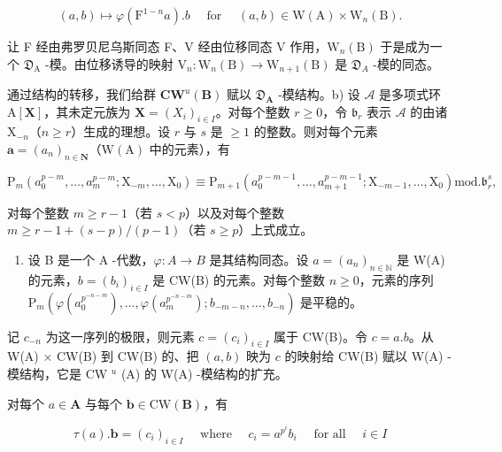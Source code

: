 \[
(a, b) \mapsto \varphi (\mathrm{F} ^ {1 - n} a). b \quad \text { for } \quad (a, b) \in \mathrm{W} (\mathrm{A}) \times \mathrm{W} _ {n} (\mathrm{B}).
\]

让 F 经由弗罗贝尼乌斯同态 F、V 经由位移同态 V 作用，\(\mathrm{W}_{n}(\mathrm{B})\) 于是成为一个 \(\mathfrak{D}_{\mathrm{A}}\) -模。由位移诱导的映射 \(\mathrm{V}_{n}:\mathrm{W}_{n}(\mathrm{B})\to\mathrm{W}_{n+1}(\mathrm{B})\) 是 \(\mathfrak{D}_{A}\) -模的同态。

通过结构的转移，我们给群 \(\mathbf{CW}^u (\mathbf{B})\) 赋以 \(\mathfrak{D}_{\mathbf{A}}\) -模结构。b) 设 \(\mathcal{A}\) 是多项式环 \(\mathrm{A}[\mathbf{X}]\)，其未定元族为 \(\mathbf{X} = (X_i)_{i\in I}\)。对每个整数 \(r\geqslant 0\)，令 \(\mathfrak{b}_r\) 表示 \(\mathcal{A}\) 的由诸 \(\mathrm{X}_{-n}\)（\(n\geqslant r\)）生成的理想。设 \(r\) 与 \(s\) 是 \(\geqslant 1\) 的整数。则对每个元素 \(\boldsymbol {a} = (a_n)_{n\in \mathbf{N}}\)（\(\mathrm{W(A)}\) 中的元素），有

\[
\mathrm{P} _ {m} \left(a _ {0} ^ {p - m}, \dots , a _ {m} ^ {p - m}; \mathrm{X} _ {- m}, \dots , \mathrm{X} _ {0}\right) \equiv \mathrm{P} _ {m + 1} \left(a _ {0} ^ {p - m - 1}, \dots , a _ {m + 1} ^ {p - m - 1}; \mathrm{X} _ {- m - 1}, \dots , \mathrm{X} _ {0}\right) \text {mod.} \mathfrak {b} _ {r} ^ {s},
\]

对每个整数 \(m \geqslant r - 1\)（若 \(s < p\)）以及对每个整数 \(m \geqslant r - 1 + (s - p) / (p - 1)\)（若 \(s \geqslant p\)）上式成立。

\begin{enumerate}
\def\labelenumi{\alph{enumi})}
\setcounter{enumi}{2}
\tightlist
\item
  设 B 是一个 A -代数，\(\varphi: A \to B\) 是其结构同态。设 \(a = (a_n)_{n \in \mathbb{N}}\) 是 W(A) 的元素，\(b = (b_i)_{i \in I}\) 是 CW(B) 的元素。对每个整数 \(n \geqslant 0\)，元素的序列 \(\mathrm{P}_m(\varphi(a_0^{p^{-n-m}}), \ldots, \varphi(a_m^{p^{-n-m}}); b_{-m-n}, \ldots, b_{-n})\) 是平稳的。
\end{enumerate}

记 \(c_{-n}\) 为这一序列的极限，则元素 \(c = (c_i)_{i\in I}\) 属于 CW(B)。令 \(c = a.b\)。从 W(A) × CW(B) 到 CW(B) 的、把 \((a,b)\) 映为 \(c\) 的映射给 CW(B) 赋以 W(A) -模结构，它是 CW \(^u\) (A) 的 W(A) -模结构的扩充。

对每个 \(a \in \mathbf{A}\) 与每个 \(\pmb{b} \in \mathrm{CW}(\mathbf{B})\)，有

\[
\tau (a). \boldsymbol {b} = \left(c _ {i}\right) _ {i \in I} \quad \text { where } \quad c _ {i} = a ^ {p ^ {i}} b _ {i} \quad \text { for all } \quad i \in I
\]

